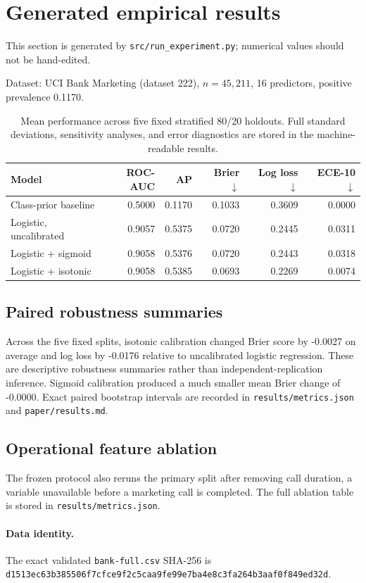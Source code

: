 \section{Generated empirical results}
This section is generated by \texttt{src/run\_experiment.py}; numerical values should not be hand-edited.

Dataset: UCI Bank Marketing (dataset 222), $n=45,211$, 16 predictors, positive prevalence 0.1170.

\begin{table}[htbp]
\centering
\small
\begin{tabular}{lrrrrr}
\toprule
Model & ROC-AUC & AP & Brier $\downarrow$ & Log loss $\downarrow$ & ECE-10 $\downarrow$ \\
\midrule
Class-prior baseline & 0.5000 & 0.1170 & 0.1033 & 0.3609 & 0.0000 \\
Logistic, uncalibrated & 0.9057 & 0.5375 & 0.0720 & 0.2445 & 0.0311 \\
Logistic + sigmoid & 0.9058 & 0.5376 & 0.0720 & 0.2443 & 0.0318 \\
Logistic + isotonic & 0.9058 & 0.5385 & 0.0693 & 0.2269 & 0.0074 \\
\bottomrule
\end{tabular}
\caption{Mean performance across five fixed stratified 80/20 holdouts. Full standard deviations, sensitivity analyses, and error diagnostics are stored in the machine-readable results.}
\label{tab:main-results}
\end{table}

\subsection{Paired robustness summaries}
Across the five fixed splits, isotonic calibration changed Brier score by -0.0027 on average and log loss by -0.0176 relative to uncalibrated logistic regression. These are descriptive robustness summaries rather than independent-replication inference.
Sigmoid calibration produced a much smaller mean Brier change of -0.0000. Exact paired bootstrap intervals are recorded in \texttt{results/metrics.json} and \texttt{paper/results.md}.

\subsection{Operational feature ablation}
The frozen protocol also reruns the primary split after removing call duration, a variable unavailable before a marketing call is completed. The full ablation table is stored in \texttt{results/metrics.json}.

\paragraph{Data identity.}
The exact validated \texttt{bank-full.csv} SHA-256 is \texttt{d1513ec63b385506f7cfce9f2c5caa9fe99e7ba4e8c3fa264b3aaf0f849ed32d}.
